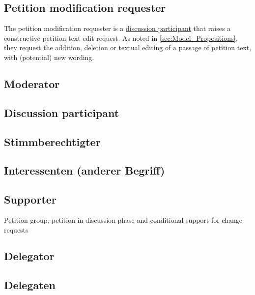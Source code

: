 
\subsection{Petition modification requester}
The petition modification requester is a \href{sssec:Roles_DiscussionParticipant}{discussion participant} that raises a constructive petition text edit request. 
As noted in \ref{sec:Model_Propositions}, they request the addition, deletion or textual editing of a passage of petition text, with (potential) new wording. 


\subsection{Moderator}
\label{ssec:Roles_Moderator}

\subsection{Discussion participant}
\label{ssec:Roles_DiscussionParticipant}

\subsection{Stimmberechtigter}
\label{ssec:Roles_Stimmberechtigter}

\subsection{Interessenten (anderer Begriff)}
\label{ssec:Roles_Interessenten}

\subsection{Supporter}
\label{ssec:Roles_Supporter}
Petition group, petition in discussion phase and conditional support for change requests

\subsection{Delegator}
\label{ssec:Roles_Delegator}

\subsection{Delegaten}
\label{ssec:Roles_Delegaten}

